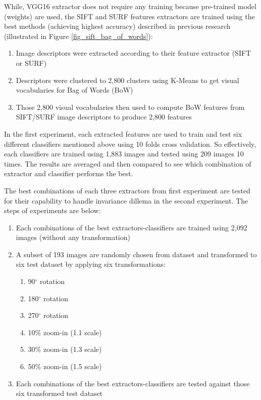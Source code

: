 \documentclass[conference, compsoc]{IEEEtran}
\begin{document}
While, VGG16 extractor does not require any training because pre-trained model (weights) are used, the SIFT and SURF features extractors are trained using the best methods (achieving highest accuracy) described in previous research \cite{azhar2015batik} (illustrated in Figure \ref{fig_sift_bag_of_words}):

\begin{enumerate}
	\item Image descriptors were extracted according to their feature extractor (SIFT or SURF)
	\item Descriptors were clustered to 2,800 clusters using K-Means to get visual vocabularies for Bag of Words (BoW)
	\item Those 2,800 visual vocabularies then used to compute BoW features from SIFT/SURF image descriptors to produce 2,800 features
\end{enumerate} 

In the first experiment, each extracted features are used to train and test six different classifiers mentioned above using 10 folds cross validation. So effectively, each classifiers are trained using 1,883 images and tested using 209 images 10 times. The results are averaged and then compared to see which combination of extractor and classifier performs the best.

The best combinations of each three extractors from first experiment are tested for their capability to handle invariance dillema in the second experiment. The steps of experiments are below:

\begin{enumerate}
	\item Each combinations of the best extractors-classifiers are trained using 2,092 images (without any transformation)
	\item A subset of 193 images are randomly chosen from dataset and transformed to six test dataset by applying six transformations: 
	\begin{enumerate}
		\item 90$^{\circ}$ rotation
		\item 180$^{\circ}$ rotation
		\item 270$^{\circ}$ rotation
		\item 10\% zoom-in (1.1 scale)
		\item 30\% zoom-in (1.3 scale)
		\item 50\% zoom-in (1.5 scale)										
	\end{enumerate}
	\item Each combinations of the best extractors-classifiers are tested against those six transformed test dataset
\end{enumerate}
\end{document}
